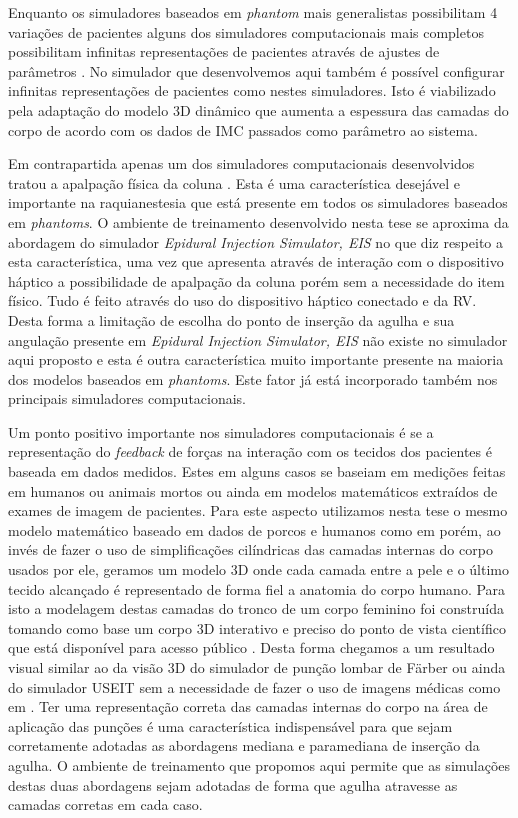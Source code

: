 Enquanto os simuladores baseados em \textit{phantom} mais generalistas possibilitam 4 variações de pacientes alguns dos simuladores computacionais mais completos possibilitam infinitas representações de pacientes através de ajustes de parâmetros \cite{Stredney1996, Wilson2003, N.2013, Brazil2017}. No simulador que desenvolvemos aqui também é possível configurar infinitas representações de pacientes como nestes simuladores. Isto é viabilizado pela adaptação do modelo 3D dinâmico que aumenta a espessura das camadas do corpo de acordo com os dados de \acrshort{IMC} passados como parâmetro ao sistema.  

Em contrapartida apenas um dos simuladores computacionais desenvolvidos tratou a apalpação física da coluna \cite{Wilson2003}. Esta é uma característica desejável e importante na raquianestesia que está presente em todos os simuladores baseados em \textit{phantoms}. O ambiente de treinamento desenvolvido nesta tese se aproxima da abordagem do simulador \textit{Epidural Injection Simulator, EIS} \cite{Wilson2003} no que diz respeito a esta característica, uma vez que apresenta através de interação com o dispositivo háptico a possibilidade de apalpação da coluna porém sem a necessidade do item físico. Tudo é feito através do uso do dispositivo háptico conectado e da \acrshort{RV}. Desta forma a limitação de escolha do ponto de inserção da agulha e sua angulação presente em \textit{Epidural Injection Simulator, EIS} não existe no simulador aqui proposto e esta é outra característica muito importante presente na maioria dos modelos baseados em \textit{phantoms}. Este fator já está incorporado também nos principais simuladores computacionais.

Um ponto positivo importante nos simuladores computacionais é se a representação do \textit{feedback} de forças na interação com os tecidos dos pacientes é baseada em dados medidos. Estes em alguns casos se baseiam em medições feitas em humanos ou animais mortos ou ainda em modelos matemáticos extraídos de exames de imagem de pacientes. Para este aspecto utilizamos nesta tese o mesmo modelo matemático baseado em dados de porcos e humanos como em \textcite{Brazil2017} porém, ao invés de fazer o uso de simplificações cilíndricas das camadas internas do corpo usados por ele, geramos um modelo 3D onde cada camada entre a pele e o último tecido alcançado é representado de forma fiel a anatomia do corpo humano. Para isto a modelagem destas camadas do tronco de um corpo feminino foi construída tomando como base um corpo 3D interativo e preciso do ponto de vista científico que está disponível para acesso público \cite{BioDigitalInc2019}. Desta forma chegamos a um resultado visual similar ao da visão 3D do simulador de punção lombar de Färber ou ainda do simulador USEIT sem a necessidade de fazer o uso de imagens médicas como em \textcite{Farber2009}. Ter uma representação correta das camadas internas do corpo na área de aplicação das punções é uma característica indispensável para que sejam corretamente adotadas as abordagens mediana e paramediana de inserção da agulha. O ambiente de treinamento que propomos aqui permite que as simulações destas duas abordagens sejam adotadas de forma que agulha atravesse as camadas corretas em cada caso. 

